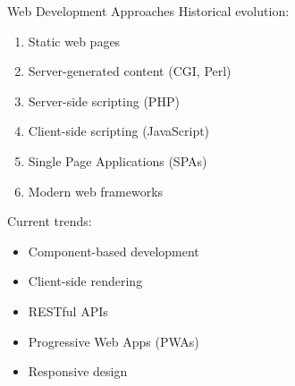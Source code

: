 \begin{concept}{Web Development Approaches}
    Historical evolution:
    \begin{enumerate}
        \item Static web pages
        \item Server-generated content (CGI, Perl)
        \item Server-side scripting (PHP)
        \item Client-side scripting (JavaScript)
        \item Single Page Applications (SPAs)
        \item Modern web frameworks
    \end{enumerate}
    
    Current trends:
    \begin{itemize}
        \item Component-based development
        \item Client-side rendering
        \item RESTful APIs
        \item Progressive Web Apps (PWAs)
        \item Responsive design
    \end{itemize}
\end{concept}